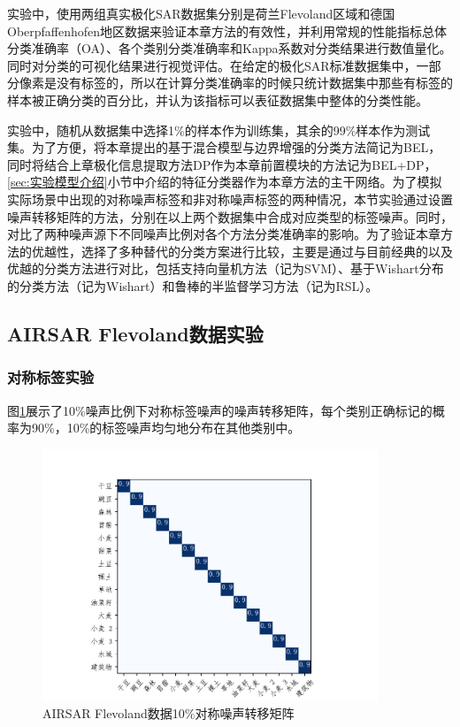 实验中，使用两组真实极化SAR数据集分别是荷兰Flevoland区域和德国Oberpfaffenhofen地区数据来验证本章方法的有效性，并利用常规的性能指标总体分类准确率（OA）、各个类别分类准确率和Kappa系数对分类结果进行数值量化。同时对分类的可视化结果进行视觉评估。在给定的极化SAR标准数据集中，一部分像素是没有标签的，所以在计算分类准确率的时候只统计数据集中那些有标签的样本被正确分类的百分比，并认为该指标可以表征数据集中整体的分类性能。

实验中，随机从数据集中选择1\%的样本作为训练集，其余的99\%样本作为测试集。为了方便，将本章提出的基于混合模型与边界增强的分类方法简记为BEL，同时将结合上章极化信息提取方法DP作为本章前置模块的方法记为BEL+DP，\ref{sec:实验模型介绍}小节中介绍的特征分类器作为本章方法的主干网络。为了模拟实际场景中出现的对称噪声标签和非对称噪声标签的两种情况，本节实验通过设置噪声转移矩阵的方法，分别在以上两个数据集中合成对应类型的标签噪声。同时，对比了两种噪声源下不同噪声比例对各个方法分类准确率的影响。为了验证本章方法的优越性，选择了多种替代的分类方案进行比较，主要是通过与目前经典的以及优越的分类方法进行对比，包括支持向量机方法（记为SVM）、基于Wishart分布的分类方法（记为Wishart）和鲁棒的半监督学习方法（记为RSL）。


\subsection{AIRSAR Flevoland数据实验}
\subsubsection{对称标签实验}
图\ref{fig:fle_noise_uniform}展示了10\%噪声比例下对称标签噪声的噪声转移矩阵，每个类别正确标记的概率为90\%，10\%的标签噪声均匀地分布在其他类别中。
\begin{figure}[h]
  \centering
  \includegraphics[width=10.04cm]{pic/chapter4/fle/noise_uniform.pdf}
  \caption{AIRSAR Flevoland数据10\%对称噪声转移矩阵}
  \label{fig:fle_noise_uniform}
\end{figure}

